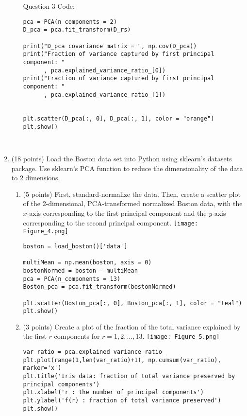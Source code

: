 \documentclass[11pt]{article}
\begin{document}
\begin{enumerate}
\begin{enumerate}
        Question 3 Code:
        \begin{verbatim}
pca = PCA(n_components = 2)
D_pca = pca.fit_transform(D_rs)

print("D_pca covariance matrix = ", np.cov(D_pca))
print("Fraction of variance captured by first principal component: "
      , pca.explained_variance_ratio_[0])
print("Fraction of variance captured by first principal component: "
      , pca.explained_variance_ratio_[1])


plt.scatter(D_pca[:, 0], D_pca[:, 1], color = "orange")
plt.show()

            
        \end{verbatim}

    \end{enumerate}

    \newpage
    \item (18 points) Load the Boston data set into Python using sklearn's
    datasets package. Use sklearn's PCA function to reduce the dimensionality of
    the data to 2 dimensions.

    
    \begin{enumerate}

        \item (5 points) First, standard-normalize the data. Then, create a
        scatter plot of the 2-dimensional, PCA-transformed normalized Boston
        data, with the $x$-axis corresponding to the first principal component
        and the $y$-axis corresponding to the second principal component.
        \label{item:4.1}
        \newline \texttt{[image: Figure\_4.png]}
        \newline \begin{verbatim}
boston = load_boston()['data']

multiMean = np.mean(boston, axis = 0)
bostonNormed = boston - multiMean
pca = PCA(n_components = 13)
Boston_pca = pca.fit_transform(bostonNormed)

plt.scatter(Boston_pca[:, 0], Boston_pca[:, 1], color = "teal")
plt.show()
        \end{verbatim}
        \newpage
        \item (3 points) Create a plot of the fraction of the total variance
        explained by the first $r$ components for $r = 1, 2, \ldots, 13$.
        \newline \texttt{[image: Figure\_5.png]}
        \newline \begin{verbatim}
var_ratio = pca.explained_variance_ratio_
plt.plot(range(1,len(var_ratio)+1), np.cumsum(var_ratio), marker='x')
plt.title('Iris data: fraction of total variance preserved by principal components')
plt.xlabel('r : the number of principal components')
plt.ylabel('f(r) : fraction of total variance preserved')
plt.show()
        \end{verbatim}


\end{enumerate}
\end{enumerate}
\end{document}
